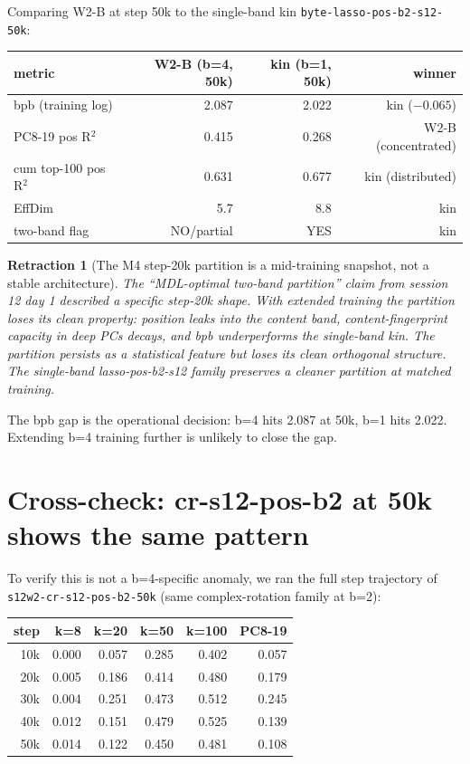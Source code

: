 \documentclass[11pt,openany]{book}
\newtheorem{retraction}{Retraction}[chapter]
\begin{document}
Comparing W2-B at step 50k to the single-band kin
\texttt{byte-lasso-pos-b2-s12-50k}:

\begin{longtable}{lrrr}
\toprule
metric & W2-B (b=4, 50k) & kin (b=1, 50k) & winner \\
\midrule
bpb (training log)  & 2.087 & 2.022 & kin ($-0.065$) \\
PC8-19 pos R$^2$    & 0.415 & 0.268 & W2-B (concentrated) \\
cum top-100 pos R$^2$ & 0.631 & 0.677 & kin (distributed) \\
EffDim               & 5.7  & 8.8   & kin \\
two-band flag        & NO/partial   & YES & kin \\
\bottomrule
\end{longtable}

\begin{retraction}[The M4 step-20k partition is a mid-training snapshot, not
a stable architecture]
The ``MDL-optimal two-band partition'' claim from session 12 day 1 described
a specific step-20k shape. With extended training the partition loses its
clean property: position leaks into the content band, content-fingerprint
capacity in deep PCs decays, and bpb underperforms the single-band kin. The
partition persists as a statistical feature but loses its clean orthogonal
structure. The single-band lasso-pos-b2-s12 family preserves a cleaner
partition at matched training.
\end{retraction}

The bpb gap is the operational decision: b=4 hits 2.087 at 50k, b=1 hits
2.022. Extending b=4 training further is unlikely to close the gap.

\section{Cross-check: cr-s12-pos-b2 at 50k shows the same pattern}

To verify this is not a b=4-specific anomaly, we ran the full step
trajectory of \texttt{s12w2-cr-s12-pos-b2-50k} (same complex-rotation family
at b=2):

\begin{longtable}{rrrrrr}
\toprule
step & k=8 & k=20 & k=50 & k=100 & PC8-19 \\
\midrule
10k & 0.000 & 0.057 & 0.285 & 0.402 & 0.057 \\
20k & 0.005 & 0.186 & 0.414 & 0.480 & 0.179 \\
30k & 0.004 & 0.251 & 0.473 & 0.512 & 0.245 \\
40k & 0.012 & 0.151 & 0.479 & 0.525 & 0.139 \\
50k & 0.014 & 0.122 & 0.450 & 0.481 & 0.108 \\
\bottomrule
\end{longtable}
\end{document}
